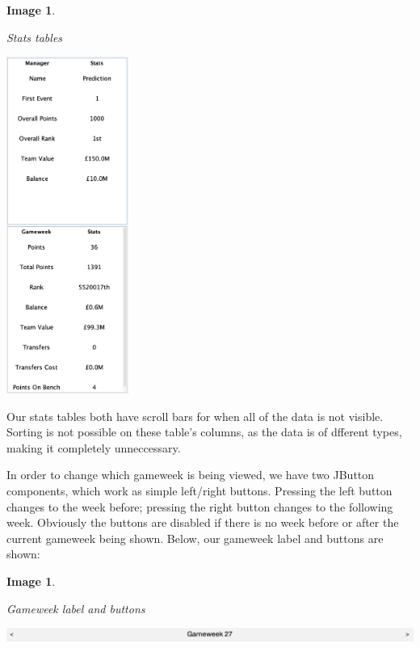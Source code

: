 \documentclass[12pt, a4paper, oneside]{book}
\newtheorem{image}[theorem]{Image}
\numberwithin{equation}{section}
\begin{document}
\begin{image} \label{Stats tables}

  Stats tables

  \vspace{0.5cm}

  \centerline{\includegraphics[width=0.3\textwidth]{images/gui/fantasy-tab/stats-tables.png}}

\end{image}

Our stats tables both have scroll bars for when all of the data is not visible. Sorting is not possible on these table's columns, as the data is of dfferent types, making it completely unneccessary.

In order to change which gameweek is being viewed, we have two JButton components, which work as simple left/right buttons. Pressing the left button changes to the week before; pressing the right button changes to the following week. Obviously the buttons are disabled if there is no week before or after the current gameweek being shown. Below, our gameweek label and buttons are shown:

\begin{image} \label{Gameweek label and buttons}

  Gameweek label and buttons

  \vspace{0.5cm}

  \centerline{\includegraphics[width=1\textwidth]{images/gui/fantasy-tab/Gameweek-label-and-buttons.png}}

\end{image}
\end{document}

